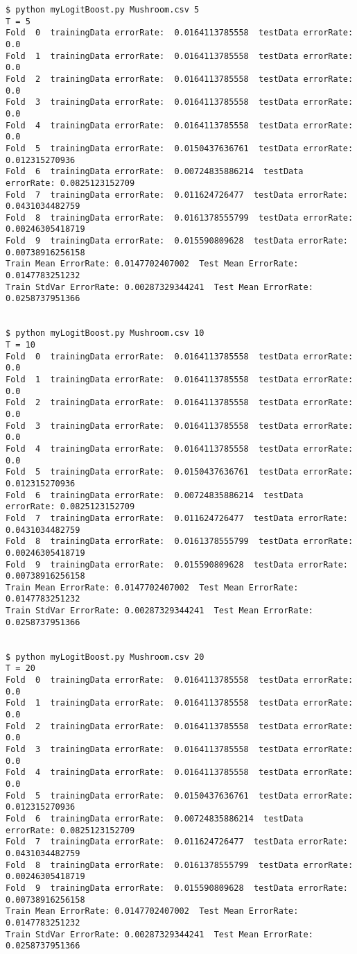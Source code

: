 \documentclass[12pt]{amsart}
\begin{document}
\begin{verbatim}
$ python myLogitBoost.py Mushroom.csv 5
T = 5
Fold  0  trainingData errorRate:  0.0164113785558  testData errorRate: 0.0
Fold  1  trainingData errorRate:  0.0164113785558  testData errorRate: 0.0
Fold  2  trainingData errorRate:  0.0164113785558  testData errorRate: 0.0
Fold  3  trainingData errorRate:  0.0164113785558  testData errorRate: 0.0
Fold  4  trainingData errorRate:  0.0164113785558  testData errorRate: 0.0
Fold  5  trainingData errorRate:  0.0150437636761  testData errorRate: 0.012315270936
Fold  6  trainingData errorRate:  0.00724835886214  testData errorRate: 0.0825123152709
Fold  7  trainingData errorRate:  0.011624726477  testData errorRate: 0.0431034482759
Fold  8  trainingData errorRate:  0.0161378555799  testData errorRate: 0.00246305418719
Fold  9  trainingData errorRate:  0.015590809628  testData errorRate: 0.00738916256158
Train Mean ErrorRate: 0.0147702407002  Test Mean ErrorRate: 0.0147783251232
Train StdVar ErrorRate: 0.00287329344241  Test Mean ErrorRate: 0.0258737951366


$ python myLogitBoost.py Mushroom.csv 10
T = 10
Fold  0  trainingData errorRate:  0.0164113785558  testData errorRate: 0.0
Fold  1  trainingData errorRate:  0.0164113785558  testData errorRate: 0.0
Fold  2  trainingData errorRate:  0.0164113785558  testData errorRate: 0.0
Fold  3  trainingData errorRate:  0.0164113785558  testData errorRate: 0.0
Fold  4  trainingData errorRate:  0.0164113785558  testData errorRate: 0.0
Fold  5  trainingData errorRate:  0.0150437636761  testData errorRate: 0.012315270936
Fold  6  trainingData errorRate:  0.00724835886214  testData errorRate: 0.0825123152709
Fold  7  trainingData errorRate:  0.011624726477  testData errorRate: 0.0431034482759
Fold  8  trainingData errorRate:  0.0161378555799  testData errorRate: 0.00246305418719
Fold  9  trainingData errorRate:  0.015590809628  testData errorRate: 0.00738916256158
Train Mean ErrorRate: 0.0147702407002  Test Mean ErrorRate: 0.0147783251232
Train StdVar ErrorRate: 0.00287329344241  Test Mean ErrorRate: 0.0258737951366


$ python myLogitBoost.py Mushroom.csv 20
T = 20
Fold  0  trainingData errorRate:  0.0164113785558  testData errorRate: 0.0
Fold  1  trainingData errorRate:  0.0164113785558  testData errorRate: 0.0
Fold  2  trainingData errorRate:  0.0164113785558  testData errorRate: 0.0
Fold  3  trainingData errorRate:  0.0164113785558  testData errorRate: 0.0
Fold  4  trainingData errorRate:  0.0164113785558  testData errorRate: 0.0
Fold  5  trainingData errorRate:  0.0150437636761  testData errorRate: 0.012315270936
Fold  6  trainingData errorRate:  0.00724835886214  testData errorRate: 0.0825123152709
Fold  7  trainingData errorRate:  0.011624726477  testData errorRate: 0.0431034482759
Fold  8  trainingData errorRate:  0.0161378555799  testData errorRate: 0.00246305418719
Fold  9  trainingData errorRate:  0.015590809628  testData errorRate: 0.00738916256158
Train Mean ErrorRate: 0.0147702407002  Test Mean ErrorRate: 0.0147783251232
Train StdVar ErrorRate: 0.00287329344241  Test Mean ErrorRate: 0.0258737951366



\end{verbatim}
\end{document}
